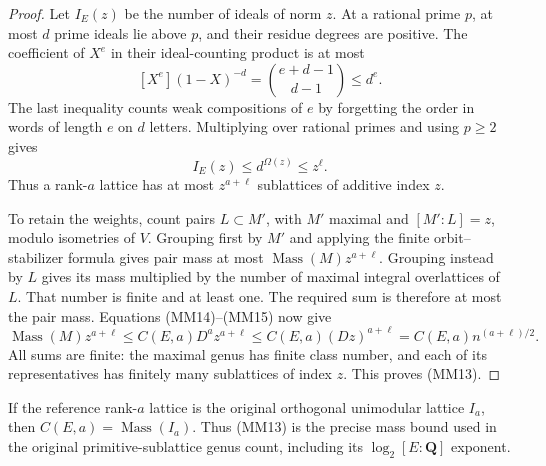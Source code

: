\begin{proof}
Let \(I_E(z)\) be the number of ideals of norm \(z\).
At a rational prime \(p\), at most \(d\) prime ideals lie
above \(p\), and their residue degrees are positive.  The
coefficient of \(X^e\) in their ideal-counting product is
at most
\[
 [X^e](1-X)^{-d}
          =\binom{e+d-1}{d-1}\leq d^e.
 \tag{MM17}
\]
The last inequality counts weak compositions of \(e\) by
forgetting the order in words of length \(e\) on \(d\) letters.
Multiplying over rational primes and using \(p\geq2\) gives
\[
 I_E(z)\leq d^{\Omega(z)}\leq z^\ell.
\]
Thus a rank-\(a\) lattice has at most \(z^{a+\ell}\)
sublattices of additive index \(z\).

To retain the weights, count pairs \(L\subset M'\), with
\(M'\) maximal and \([M':L]=z\), modulo isometries of \(V\).
Grouping first by \(M'\) and applying the finite
orbit--stabilizer formula gives pair mass at most
\(\operatorname{Mass}(M)z^{a+\ell}\).
Grouping instead by \(L\) gives its mass multiplied by the
number of maximal integral overlattices of \(L\).  That
number is finite and at least one.  The required sum is
therefore at most the pair mass.  Equations (MM14)--(MM15)
now give
\[
 \operatorname{Mass}(M)z^{a+\ell}
 \leq C(E,a)D^az^{a+\ell}
 \leq C(E,a)(Dz)^{a+\ell}
 =C(E,a)n^{(a+\ell)/2}.
\]
All sums are finite: the maximal genus has finite class
number, and each of its representatives has finitely many
sublattices of index \(z\).  This proves (MM13).
\end{proof}

If the reference rank-\(a\) lattice is the original orthogonal
unimodular lattice \(I_a\), then \(C(E,a)=\operatorname{Mass}(I_a)\).
Thus (MM13) is the precise mass bound used in the original
primitive-sublattice genus count, including its
\(\log_2[E:\mathbf Q]\) exponent.
